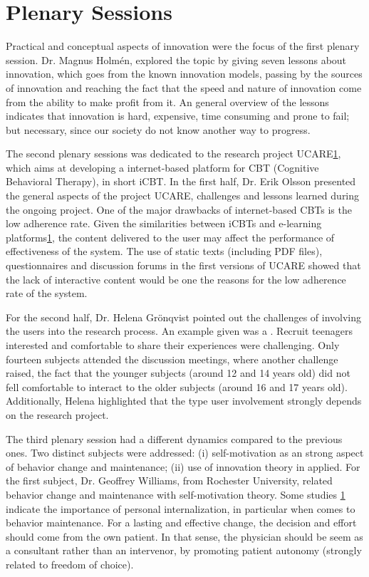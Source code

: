 \section{Plenary Sessions}


Practical and conceptual aspects of innovation were the focus of the first plenary session. 
Dr. Magnus Holm\'{e}n, explored the topic by giving seven lessons about innovation, which goes from the known innovation models, passing by the sources of innovation and reaching the fact that the speed and nature of innovation come from the ability to make profit from it. 
An general overview of the lessons indicates that innovation is hard, expensive, time consuming and prone to fail; but necessary, since our society do not know another way to progress.


The second plenary sessions was dedicated to the research project UCARE\ref{}, which aims at developing a internet-based platform for CBT (Cognitive Behavioral Therapy), in short iCBT. 
In the first half, Dr. Erik Olsson presented the general aspects of the project UCARE, challenges and lessons learned during the ongoing project. 
One of the major drawbacks of internet-based CBTs is the low adherence rate. 
Given the similarities between iCBTs and e-learning platforms\ref{}, the content delivered to the user may affect the performance of effectiveness of the system. 
The use of static texts (including PDF files), questionnaires and discussion forums in the first versions of UCARE showed that the lack of interactive content would be one the reasons for the low adherence rate of the system.

For the second half, Dr. Helena Grönqvist pointed out the challenges of involving the users into the research process. 
An example given was a . 
Recruit teenagers interested and comfortable to share their experiences were challenging. 
Only fourteen subjects attended the discussion meetings, where another challenge raised, the fact that the younger subjects (around 12 and 14 years old) did not fell comfortable to interact to the older subjects (around 16 and 17 years old). 
Additionally, Helena highlighted that the type user involvement strongly depends on the research project.


The third plenary session had a different dynamics compared to the previous ones. 
Two distinct subjects were addressed: (i) self-motivation as an strong aspect of behavior change and maintenance; (ii) use of innovation theory in applied. 
For the first subject, Dr. Geoffrey Williams, from Rochester University, related behavior change and maintenance with self-motivation theory. 
Some studies \ref{} indicate the importance of personal internalization, in particular when comes to behavior maintenance.
For a lasting and effective change, the decision and effort should come from the own patient. 
In that sense, the physician should be seem as a consultant rather than an intervenor, by promoting patient autonomy (strongly related to freedom of choice).

